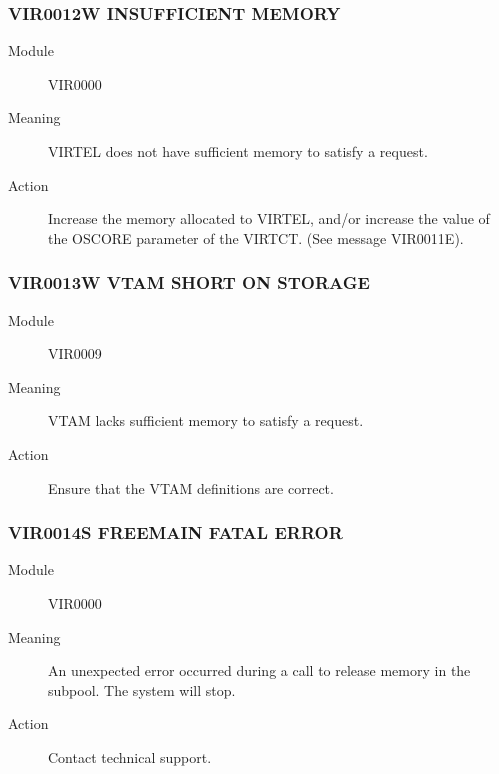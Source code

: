 \documentclass[letterpaper,10pt,english]{sphinxmanual}
\begin{document}
\subsubsection{VIR0012W INSUFFICIENT MEMORY}
\label{\detokenize{messages:vir0012w-insufficient-memory}}\begin{description}
\item[{Module}] \leavevmode
VIR0000

\item[{Meaning}] \leavevmode
VIRTEL does not have sufficient memory to satisfy a request.

\item[{Action}] \leavevmode
Increase the memory allocated to VIRTEL, and/or increase the value of the OSCORE parameter of the VIRTCT. (See message VIR0011E).

\end{description}


\subsubsection{VIR0013W VTAM SHORT ON STORAGE}
\label{\detokenize{messages:vir0013w-vtam-short-on-storage}}\begin{description}
\item[{Module}] \leavevmode
VIR0009

\item[{Meaning}] \leavevmode
VTAM lacks sufficient memory to satisfy a request.

\item[{Action}] \leavevmode
Ensure that the VTAM definitions are correct.

\end{description}


\subsubsection{VIR0014S FREEMAIN FATAL ERROR}
\label{\detokenize{messages:vir0014s-freemain-fatal-error}}\begin{description}
\item[{Module}] \leavevmode
VIR0000

\item[{Meaning}] \leavevmode
An unexpected error occurred during a call to release memory in the subpool. The system will stop.

\item[{Action}] \leavevmode
Contact technical support.

\end{description}
\end{document}
